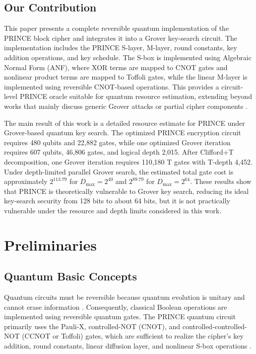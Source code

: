 \documentclass[11pt,a4paper]{article}
\begin{document}
\subsection{Our Contribution}

This paper presents a complete reversible quantum implementation of the PRINCE block cipher and integrates it into a Grover key-search circuit. The implementation includes the PRINCE S-layer, M-layer, round constants, key addition operations, and key schedule. The S-box is implemented using Algebraic Normal Form (ANF), where XOR terms are mapped to CNOT gates and nonlinear product terms are mapped to Toffoli gates, while the linear M-layer is implemented using reversible CNOT-based operations. This provides a circuit-level PRINCE oracle suitable for quantum resource estimation, extending beyond works that mainly discuss generic Grover attacks or partial cipher components \cite{akhlaq2024quantum}.

The main result of this work is a detailed resource estimate for PRINCE under Grover-based quantum key search. The optimized PRINCE encryption circuit requires 480 qubits and 22,882 gates, while one optimized Grover iteration requires 607 qubits, 46,806 gates, and logical depth 2,015. After Clifford+T decomposition, one Grover iteration requires 110,180 T gates with T-depth 4,452. Under depth-limited parallel Grover search, the estimated total gate cost is approximately $2^{113.79}$ for $D_{\max}=2^{40}$ and $2^{89.79}$ for $D_{\max}=2^{64}$. These results show that PRINCE is theoretically vulnerable to Grover key search, reducing its ideal key-search security from 128 bits to about 64 bits, but it is not practically vulnerable under the resource and depth limits considered in this work.

\section{Preliminaries}

\subsection{Quantum Basic Concepts}

Quantum circuits must be reversible because quantum evolution is unitary and cannot erase information \cite{nielsen2010quantum}. Consequently, classical Boolean operations are implemented using reversible quantum gates. The PRINCE quantum circuit primarily uses the Pauli-X, controlled-NOT (CNOT), and controlled-controlled-NOT (CCNOT or Toffoli) gates, which are sufficient to realize the cipher's key addition, round constants, linear diffusion layer, and nonlinear S-box operations \cite{barenco1995elementary}.
\end{document}
